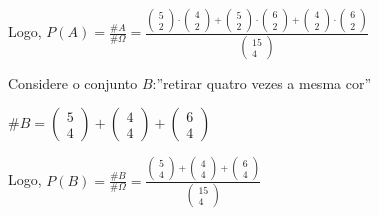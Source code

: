 \documentclass[english]{article}
\begin{document}
Logo, $P(A)=\frac{\#A}{\#\Omega}=\frac{\left(\begin{array}{c}
5\\
2
\end{array}\right)\cdot\left(\begin{array}{c}
4\\
2
\end{array}\right)+\left(\begin{array}{c}
5\\
2
\end{array}\right)\cdot\left(\begin{array}{c}
6\\
2
\end{array}\right)+\left(\begin{array}{c}
4\\
2
\end{array}\right)\cdot\left(\begin{array}{c}
6\\
2
\end{array}\right)}{\left(\begin{array}{c}
15\\
4
\end{array}\right)}$

Considere o conjunto $B$:''retirar quatro vezes a mesma cor''

$\#B=\left(\begin{array}{c}
5\\
4
\end{array}\right)+\left(\begin{array}{c}
4\\
4
\end{array}\right)+\left(\begin{array}{c}
6\\
4
\end{array}\right)$

Logo, $P(B)=\frac{\#B}{\#\Omega}=\frac{\left(\begin{array}{c}
5\\
4
\end{array}\right)+\left(\begin{array}{c}
4\\
4
\end{array}\right)+\left(\begin{array}{c}
6\\
4
\end{array}\right)}{\left(\begin{array}{c}
15\\
4
\end{array}\right)}$
\end{document}

